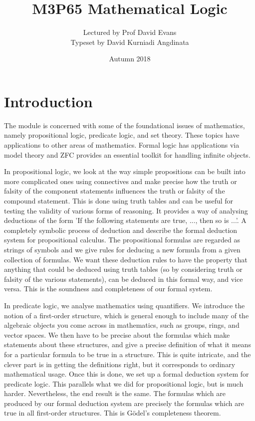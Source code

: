 \documentclass{article}
\title{M3P65 Mathematical Logic}
\author{Lectured by Prof David Evans \\ Typeset by David Kurniadi Angdinata}
\date{Autumn 2018}
\theoremstyle{definition}\newtheorem{definition}{Definition}[subsection]
\theoremstyle{definition}\newtheorem{remark}[definition]{Remark}
\theoremstyle{definition}\newtheorem*{example}{Example}
\theoremstyle{definition}\newtheorem*{note}{Note}
\begin{document}
\maketitle

\vfill

\tableofcontents

\pagebreak


\section{Introduction}

The module is concerned with some of the foundational issues of mathematics, namely propositional logic, predicate logic, and set theory. These topics have applications to other areas of mathematics. Formal logic has applications via model theory and ZFC provides an essential toolkit for handling infinite objects.

In propositional logic, we look at the way simple propositions can be built into more complicated ones using connectives and make precise how the truth or falsity of the component statements influences the truth or falsity of the compound statement. This is done using truth tables and can be useful for testing the validity of various forms of reasoning. It provides a way of analysing deductions of the form 'If the following statements are true, ..., then so is ...'. A completely symbolic process of deduction and describe the formal deduction system for propositional calculus. The propositional formulas are regarded as strings of symbols and we give rules for deducing a new formula from a given collection of formulas. We want these deduction rules to have the property that anything that could be deduced using truth tables (so by considering truth or falsity of the various statements), can be deduced in this formal way, and vice versa. This is the soundness and completeness of our formal system.

In predicate logic, we analyse mathematics using quantifiers. We introduce the notion of a first-order structure, which is general enough to include many of the algebraic objects you come across in mathematics, such as groups, rings, and vector spaces. We then have to be precise about the formulas which make statements about these structures, and give a precise definition of what it means for a particular formula to be true in a structure. This is quite intricate, and the clever part is in getting the definitions right, but it corresponds to ordinary mathematical usage. Once this is done, we set up a formal deduction system for predicate logic. This parallels what we did for propositional logic, but is much harder. Nevertheless, the end result is the same. The formulas which are produced by our formal deduction system are precisely the formulas which are true in all first-order structures. This is Gödel's completeness theorem.
\end{document}
